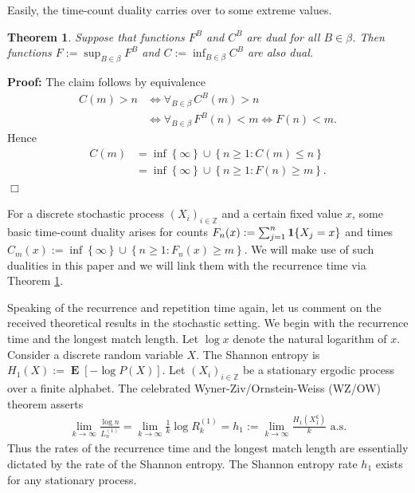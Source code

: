 \documentclass[a4paper,12pt]{article}
\newcommand{\kwad}[1]{\left[ #1 \right]}
\newcommand{\klam}[1]{\left\{ #1 \right\}}
\DeclareMathOperator{\mean}{\mathbf{E}}
\newcommand{\boole}[1]{{\bf 1}{\klam{#1}}}
\newtheorem{theorem}{Theorem}
\newenvironment*{proof}{\begin{trivlist}\item[]
\noindent\textbf{Proof:}}{$\Box$\par\end{trivlist}}
\begin{document}
Easily, the time-count duality carries over to some extreme values.
\begin{theorem}
  \label{theoExtreme}
  Suppose that functions $F^B$ and $C^B$ are dual for all
  $B\in\beta$. Then functions $F:=\sup_{B\in\beta} F^B$ and
  $C:=\inf_{B\in\beta} C^B$ are also dual.
\end{theorem}
\begin{proof}
  The claim follows by equivalence
  \begin{align}
    C(m)>n
    &\iff\forall_{B\in\beta}\,C^B(m)>n
      \nonumber\\
    &\iff
      \forall_{B\in\beta}\,F^B(n)<m
      \iff F(n)<m.
  \end{align}
  Hence
  \begin{align}
    C(m)&=\inf\klam{\infty}\cup\klam{n\ge 1: C(m)\le n}
          \nonumber\\
        &=\inf\klam{\infty}\cup\klam{n\ge 1: F(n)\ge m}.
  \end{align}
\end{proof}
For a discrete stochastic process $(X_i)_{i\in\mathbb{Z}}$ and a
certain fixed value $x$, some basic time-count duality arises for
counts $F_n(x):=\sum_{j=1}^n \boole{X_j=x}$ and times
$C_m(x):=\inf\klam{\infty}\cup\klam{n\ge 1: F_n(x)\ge m}$.  We will
make use of such dualities in this paper and we will link them with
the recurrence time via Theorem \ref{theoExtreme}.

Speaking of the recurrence and repetition time again, let us comment
on the received theoretical results in the stochastic setting. We
begin with the recurrence time and the longest match length.  Let
$\log x$ denote the natural logarithm of $x$.  Consider a discrete
random variable $X$. The Shannon entropy is
$H_1(X):=\mean\kwad{-\log P(X)}$. Let $(X_i)_{i\in\mathbb{Z}}$ be a
stationary ergodic process over a finite alphabet. The celebrated
Wyner-Ziv/Ornstein-Weiss (WZ/OW) theorem
\citep{WynerZiv89,OrnsteinWeiss93} asserts
\begin{align}
  \label{WZOW}
  \lim_{k\to\infty} \frac{\log n}{L^{(1)}_n}
  =\lim_{k\to\infty} \frac{1}{k}\log R^{(1)}_k
  =h_1:=\lim_{k\to\infty} \frac{H_1(X_1^k)}{k}
  \text{ a.s.}
\end{align}
Thus the rates of the recurrence time and the longest match length are
essentially dictated by the rate of the Shannon entropy.  The Shannon
entropy rate $h_1$ exists for any stationary process.
\end{document}
